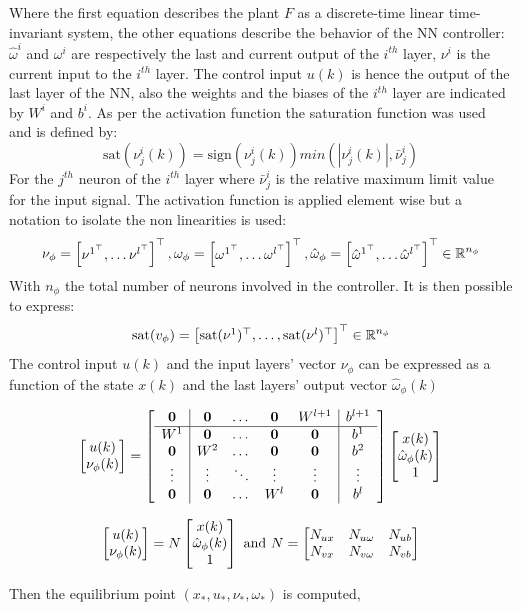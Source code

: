 \documentclass{article}
\begin{document}
Where the first equation describes the plant $F$ as a discrete-time linear time-invariant system, the other equations describe the behavior of the NN controller: $\hat{\omega}^{i}$ and $\omega^{i}$ are respectively the last and current output of the $i^{th}$ layer, $\nu^{i}$ is the current input to the $i^{th}$ layer. The control input $u(k)$ is hence the output of the last layer of the NN, also the weights and the biases of the $i^{th}$ layer are indicated by $W^{i}$ and $b^{i}$. As per the activation function the saturation function was used and is defined by:
$$
   \text{sat}(\nu^{i}_{j}(k)) = \text{sign}(\nu^{i}_{j}(k)) min(|\nu^{i}_{j}(k)|, \bar{\nu}^{i}_{j})
$$  
For the $j^{th}$ neuron of the $i^{th}$ layer where $\bar{\nu}^{i}_{j}$ is the relative maximum limit value for the input signal. The activation function is applied element wise but a notation to isolate the non linearities is used:
$$
    \nu_{\phi} = \left[\begin{matrix}\nu^{1^\top}, \dots \nu^{l^\top}\end{matrix}\right]^\top, \omega_{\phi} = \left[\begin{matrix}\omega^{1^\top}, \dots \omega^{l^\top}\end{matrix}\right]^\top, \hat{\omega}_{\phi} = \left[\begin{matrix}\hat{\omega}^{1^\top}, \dots \hat{\omega}^{l^\top}\end{matrix}\right]^\top \in {\mathbb{R}}^{n_{\phi}}
$$
With $n_{\phi}$ the total number of neurons involved in the controller. It is then possible to express:
$$
    \text{sat}(v_{\phi}) = \left[\begin{matrix}\text{sat}(\nu^{1})^\top, \dots, \text{sat}(\nu^{l})^\top\end{matrix}\right]^\top \in {\mathbb{R}}^{n_{\phi}}
$$
The control input $u(k)$ and the input layers' vector $\nu_{\phi}$ can be expressed as a function of the state $x(k)$ and the last layers' output vector $\hat{\omega}_{\phi}(k)$

\begin{equation}
    \left[\begin{matrix}u(k)\\ \nu_{\phi}(k)\end{matrix}\right] = \left[\begin{matrix}\begin{array}{c|cccc|c} 
        \operatorname{\mathbf{0}} & \operatorname{\mathbf{0}} & \dots & \operatorname{\mathbf{0}} & W^{l+1} & b^{l+1}\\
        \hline
        W^{1} & \operatorname{\mathbf{0}} & \dots & \operatorname{\mathbf{0}} & \operatorname{\mathbf{0}} & b^{1}\\
        \operatorname{\mathbf{0}} & W^{2} & \dots & \operatorname{\mathbf{0}} & \operatorname{\mathbf{0}} & b^{2}\\
        \vdots & \vdots & \ddots & \vdots & \vdots & \vdots\\
        \operatorname{\mathbf{0}} & \operatorname{\mathbf{0}} & \dots & W^{l} & \operatorname{\mathbf{0}} & b^{l}
    \end{array}\end{matrix}\right]  \left[\begin{matrix}x(k) \\ \hat{\omega}_{\phi}(k) \\ 1\end{matrix}\right]
\end{equation}

$$
    \left[\begin{matrix}u(k)\\ \nu_{\phi}(k)\end{matrix}\right] = N  \left[\begin{matrix}x(k) \\ \hat{\omega}_{\phi}(k) \\ 1\end{matrix}\right]\text{ and } N = \left[\begin{matrix}N_{ux} & N_{u \omega} & N_{ub} \\ N_{vx} & N_{v \omega} & N_{vb}\end{matrix}\right]
$$

Then the equilibrium point $\left( x_{*}, u_{*}, \nu_{*}, \omega_{*} \right)$ is computed, 

\pagebreak
\printbibliography
\end{document}
